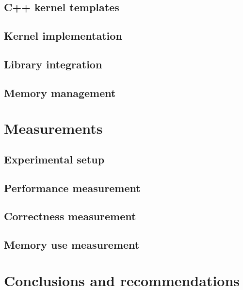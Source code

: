 \documentclass[11pt,twoside]{ce}
\begin{document}
\section{C++ kernel templates}


\section{Kernel implementation}


\section{Library integration}


\section{Memory management}


\chapter{Measurements}
\label{chap:measurements}


\section{Experimental setup}


\section{Performance measurement}


\section{Correctness measurement}


\section{Memory use measurement}


\chapter{Conclusions and recommendations}
\label{chap:ccl}

\end{document}
